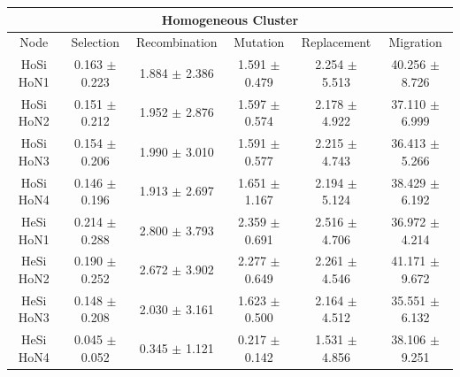 \documentclass[final,1p,times]{elsarticle}
\begin{document}
\begin{table}[htb]
{\begin{tabular}{|c|c|c|c|c|c|}
\multicolumn{6}{|c|}{Homogeneous Cluster} \\ \hline                                 
Node    & Selection     & Recombination     & Mutation      & Replacement       & Migration \\ \hline
HoSi HoN1    & 0.163 $\pm$  0.223 &  1.884 $\pm$  2.386  & 1.591  $\pm$ 0.479 &  2.254  $\pm$ 5.513  & 40.256  $\pm$ 8.726\\ \hline
HoSi HoN2    & 0.151 $\pm$  0.212 &  1.952 $\pm$  2.876  & 1.597  $\pm$ 0.574 &  2.178  $\pm$ 4.922  & 37.110  $\pm$ 6.999\\ \hline
HoSi HoN3    & 0.154 $\pm$  0.206 &  1.990 $\pm$  3.010  & 1.591  $\pm$ 0.577 &  2.215  $\pm$ 4.743  & 36.413  $\pm$ 5.266\\ \hline
HoSi HoN4    & 0.146 $\pm$  0.196 &  1.913 $\pm$  2.697  & 1.651  $\pm$ 1.167 &  2.194  $\pm$ 5.124  & 38.429  $\pm$ 6.192\\ \hline \hline
HeSi HoN1    & 0.214 $\pm$  0.288  & 2.800  $\pm$ 3.793 &  2.359 $\pm$  0.691 &  2.516  $\pm$ 4.706 &  36.972 $\pm$ 4.214 \\ \hline
HeSi HoN2    & 0.190 $\pm$  0.252  & 2.672  $\pm$ 3.902 &  2.277 $\pm$  0.649 &  2.261  $\pm$ 4.546 &  41.171 $\pm$ 9.672 \\ \hline
HeSi HoN3    & 0.148 $\pm$  0.208  & 2.030  $\pm$ 3.161 &  1.623 $\pm$  0.500 &  2.164  $\pm$ 4.512 &  35.551 $\pm$  6.132 \\ \hline
HeSi HoN4    & 0.045 $\pm$  0.052  & 0.345  $\pm$ 1.121 &  0.217 $\pm$  0.142 &  1.531  $\pm$ 4.856 &  38.106 $\pm$ 9.251 \\ \hline
\end{tabular}
}
\label{tab:mmdptimes}
\end{table}
\end{document}
